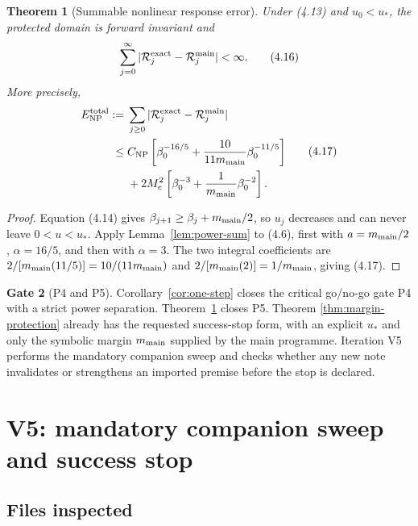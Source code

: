 \documentclass[11pt]{article}
\newtheorem{theorem}{Theorem}[section]
\theoremstyle{definition}
\newtheorem{gate}[theorem]{Gate}
\theoremstyle{remark}
\newcommand{\cR}{\mathcal R}
\begin{document}
\begin{theorem}[Summable nonlinear response error]
\label{thm:summable}
Under (4.13) and $u_0<u_*$, the protected domain is forward invariant and
\[
 \sum_{j=0}^\infty
 |\cR_j^{\rm exact}-\cR_j^{\rm main}|<\infty.            \tag{4.16}
\]
More precisely,
\begin{equation}
\begin{split}
 E_{\rm NP}^{\rm total}
 :={}&\sum_{j\ge0}
 |\cR_j^{\rm exact}-\cR_j^{\rm main}|\\
 \le{}&
 C_{\rm NP}\left[
 \beta_0^{-16/5}
 +\frac{10}{11m_{\rm main}}\beta_0^{-11/5}\right]\\
 &+2M_c^2\left[
 \beta_0^{-3}+\frac1{m_{\rm main}}\beta_0^{-2}\right].
\end{split}
\tag{4.17}
\end{equation}
\end{theorem}

\begin{proof}
Equation (4.14) gives
$\beta_{j+1}\ge\beta_j+m_{\rm main}/2$, so $u_j$ decreases and can never
leave $0<u<u_*$.  Apply Lemma~\ref{lem:power-sum} to (4.6), first with
$a=m_{\rm main}/2$, $\alpha=16/5$, and then with $\alpha=3$.
The two integral coefficients are
$2/[m_{\rm main}(11/5)]=10/(11m_{\rm main})$ and
$2/[m_{\rm main}(2)]=1/m_{\rm main}$, giving (4.17).
\end{proof}

\begin{gate}[P4 and P5]
Corollary~\ref{cor:one-step} closes the critical go/no-go gate P4 with a
strict power separation.  Theorem~\ref{thm:summable} closes P5.  Theorem
\ref{thm:margin-protection} already has the requested success-stop form, with
an explicit $u_*$ and only the symbolic margin $m_{\rm main}$ supplied by the
main programme.  Iteration V5 performs the mandatory companion sweep and
checks whether any new note invalidates or strengthens an imported premise
before the stop is declared.
\end{gate}

\section{V5: mandatory companion sweep and success stop}

\subsection{Files inspected}
\end{document}
